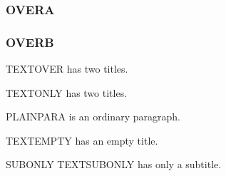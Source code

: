 \documentclass[a4paper]{memoir}
\begin{document}
\begin{frame}
  \frametitle<1>{OVERA}
  \frametitle<2>{OVERB}
  TEXTOVER has two titles.
\end{frame}
\begin{frame}
  TEXTONLY has two titles.
\end{frame}

PLAINPARA is an ordinary paragraph.

\begin{frame}{}
  TEXTEMPTY has an empty title.
\end{frame}
\begin{frame}{}{SUBONLY}
  TEXTSUBONLY has only a subtitle.
\end{frame}
\end{document}
